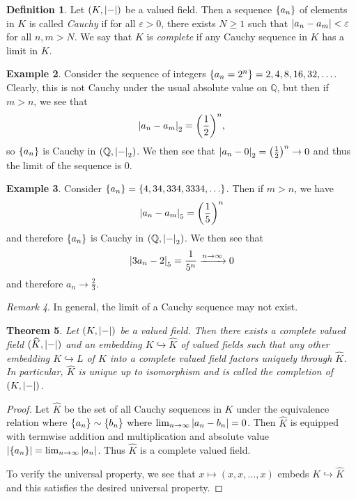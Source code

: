 \documentclass[leqno, openany]{memoir}
\newtheorem{thm}{Theorem}[section]
\theoremstyle{definition}
\newtheorem{defn}[thm]{Definition}
\newtheorem{exm}[thm]{Example}
\theoremstyle{remark}
\newtheorem{rmk}[thm]{Remark}
\theoremstyle{plain}
\theoremstyle{definition}
\theoremstyle{remark}
\newcommand{\Q}{\mathbb{Q}}
\newcommand{\ep}{\varepsilon}
\newcommand{\wh}[1]{\widehat{#1}}
\begin{document}
\begin{defn}
    Let $(K, \abs{-})$ be a valued field. Then a sequence $\qty{a_n}$ of elements in $K$ is called \textit{Cauchy} if for all $\ep > 0$, there exists $N \geq 1$ such that $\abs{a_n - a_m} < \ep$ for all $n,m > N$. We say that $K$ is \textit{complete} if any Cauchy sequence in $K$ has a limit in $K$.
\end{defn}

\begin{exm}
    Consider the sequence of integers $\qty{a_n = 2^n} = 2, 4, 8, 16, 32, \ldots$. Clearly, this is not Cauchy under the usual absolute value on $\Q$, but then if $m > n$, we see that 
    \[ \abs{a_n - a_m}_2 = \qty(\frac{1}{2})^n, \] 
    so $\qty{a_n}$ is Cauchy in $(\Q, \abs{-}_2)$. We then see that $\abs{a_n - 0}_2 = \qty(\frac{1}{2})^n \to 0$ and thus the limit of the sequence is $0$.
\end{exm}

\begin{exm}
    Consider $\qty{a_n} = \qty{4, 34, 334, 3334, \ldots}$. Then if $m > n$, we have
    \[ \abs{a_n - a_m}_5 = {\qty(\frac{1}{5})}^n \]
    and therefore $\qty{a_n}$ is Cauchy in $(\Q,\abs{-}_2)$. We then see that 
    \[ \abs{3 a_n - 2}_5 = \frac{1}{5^n} \xrightarrow{n \to \infty} 0 \]
    and therefore $a_n \to \frac{2}{3}$.
\end{exm}

\begin{rmk}
    In general, the limit of a Cauchy sequence may not exist.
\end{rmk}

\begin{thm}
    Let $(K, \abs{-})$ be a valued field. Then there exists a complete valued field $(\wh{K}, \abs{-})$ and an embedding $K \hookrightarrow \wh{K}$ of valued fields such that any other embedding $K \hookrightarrow L$ of $K$ into a complete valued field factors uniquely through $\wh{K}$. In particular, $\wh{K}$ is unique up to isomorphism and is called the \textit{completion} of $(K, \abs{-})$. 
\end{thm}

\begin{proof}
    Let $\wh{K}$ be the set of all Cauchy sequences in $K$ under the equivalence relation where $\qty{a_n} \sim \qty{b_n}$ where $\lim_{n \to \infty} \abs{a_n - b_n} = 0$. Then $\wh{K}$ is equipped with termwise addition and multiplication and absolute value $\abs{\qty{a_n}} = \lim_{n \to \infty} \abs{a_n}$. Thus $\wh{K}$ is a complete valued field.

    To verify the universal property, we see that $x \mapsto (x, x, \ldots, x)$ embeds $K \hookrightarrow \wh{K}$ and this satisfies the desired universal property.
\end{proof}
\end{document}
